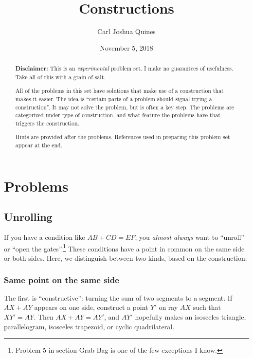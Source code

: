 \documentclass[11pt,paper=letter]{scrartcl}
\begin{document}
\title{Constructions}
\author{Carl Joshua Quines}
\date{November 5, 2018}

\maketitle

\begin{abstract}

\noindent\textbf{Disclaimer:} This is an \emph{experimental} problem set. I make no guarantees of usefulness. Take all of this with a grain of salt.

All of the problems in this set have solutions that make use of a construction that makes it easier. The idea is ``certain parts of a problem should signal trying a construction''. It may not solve the problem, but is often a key step. The problems are categorized under type of construction, and what feature the problems have that triggers the construction.

Hints are provided after the problems. References used in preparing this problem set appear at the end.

\end{abstract}

\section{Problems}

\subsection{Unrolling}

If you have a condition like $AB + CD = EF$, you \emph{almost always} want to ``unroll'' or ``open the gates''.\footnote{Problem 5 in section Grab Bag is one of the few exceptions I know.} These conditions have a point in common on the same side or both sides. Here, we distinguish between two kinds, based on the construction:

\subsubsection*{Same point on the same side}

The first is ``constructive'': turning the sum of two segments to a segment. If $AX + AY$ appears on one side, construct a point $Y'$ on ray $AX$ such that $XY' = AY$. Then $AX + AY = AY'$, and $AY'$ hopefully makes an isosceles triangle, parallelogram, isosceles trapezoid, or cyclic quadrilateral.
\end{document}
